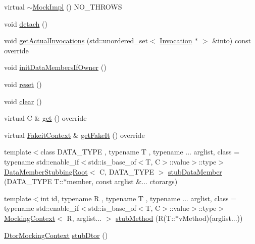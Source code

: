 \begin{DoxyCompactItemize}
virtual \mbox{\hyperlink{classfakeit_1_1MockImpl_aafbd9e9c1f6691f7cee440c52ae07220}{$\sim$\+Mock\+Impl}} () N\+O\+\_\+\+T\+H\+R\+O\+WS
\item 
void \mbox{\hyperlink{classfakeit_1_1MockImpl_a48e09b74451cf9c435aab31b077cce26}{detach}} ()
\item 
void \mbox{\hyperlink{classfakeit_1_1MockImpl_a04c3121eb7d380226f1beabf4b18ee82}{get\+Actual\+Invocations}} (std\+::unordered\+\_\+set$<$ \mbox{\hyperlink{structfakeit_1_1Invocation}{Invocation}} $\ast$ $>$ \&into) const override
\item 
void \mbox{\hyperlink{classfakeit_1_1MockImpl_ad403c33f4734e31196ead952fc4c4805}{init\+Data\+Members\+If\+Owner}} ()
\item 
void \mbox{\hyperlink{classfakeit_1_1MockImpl_aad69a9c36fc64d0890f21ff15318a206}{reset}} ()
\item 
void \mbox{\hyperlink{classfakeit_1_1MockImpl_a3985505d2ec7bd50a5d71f155c5ae458}{clear}} ()
\item 
virtual C \& \mbox{\hyperlink{classfakeit_1_1MockImpl_a8f287e857fde9a0941c618ff5459bd88}{get}} () override
\item 
virtual \mbox{\hyperlink{structfakeit_1_1FakeitContext}{Fakeit\+Context}} \& \mbox{\hyperlink{classfakeit_1_1MockImpl_a1b51dd1918a32ec5d450fc804ad37e63}{get\+Fake\+It}} () override
\item 
{\footnotesize template$<$class D\+A\+T\+A\+\_\+\+T\+Y\+PE , typename T , typename ... arglist, class  = typename std\+::enable\+\_\+if$<$std\+::is\+\_\+base\+\_\+of$<$\+T, C$>$\+::value$>$\+::type$>$ }\\\mbox{\hyperlink{classfakeit_1_1DataMemberStubbingRoot}{Data\+Member\+Stubbing\+Root}}$<$ C, D\+A\+T\+A\+\_\+\+T\+Y\+PE $>$ \mbox{\hyperlink{classfakeit_1_1MockImpl_acaa4bcb3984d3ca5fd1ecb3095393951}{stub\+Data\+Member}} (D\+A\+T\+A\+\_\+\+T\+Y\+PE T\+::$\ast$member, const arglist \&... ctorargs)
\item 
{\footnotesize template$<$int id, typename R , typename T , typename ... arglist, class  = typename std\+::enable\+\_\+if$<$std\+::is\+\_\+base\+\_\+of$<$\+T, C$>$\+::value$>$\+::type$>$ }\\\mbox{\hyperlink{classfakeit_1_1MockingContext}{Mocking\+Context}}$<$ R, arglist... $>$ \mbox{\hyperlink{classfakeit_1_1MockImpl_a603befd40e35ea88c7efee965f15bb60}{stub\+Method}} (R(T\+::$\ast$v\+Method)(arglist...))
\item 
\mbox{\hyperlink{classfakeit_1_1DtorMockingContext}{Dtor\+Mocking\+Context}} \mbox{\hyperlink{classfakeit_1_1MockImpl_ae64cb908c91a96faefbf0fabac948f29}{stub\+Dtor}} ()

\end{DoxyCompactItemize}
